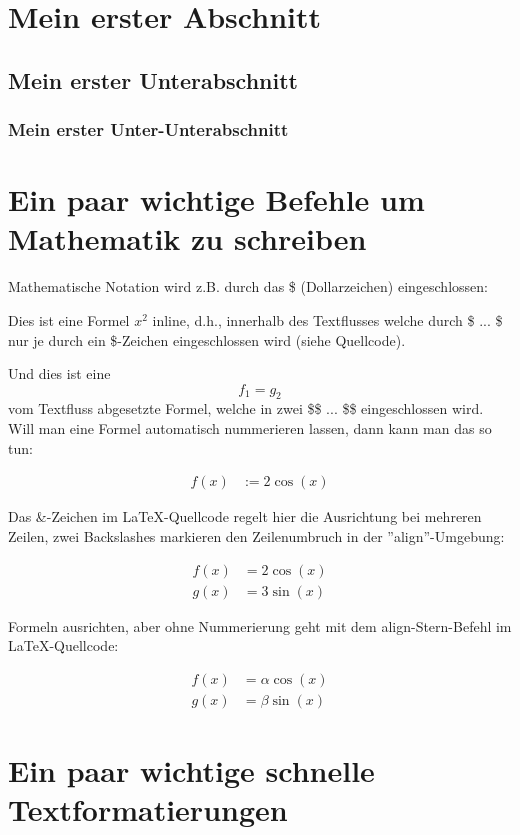 \section{Mein erster Abschnitt}

\subsection{Mein erster Unterabschnitt}

\subsubsection{Mein erster Unter-Unterabschnitt}

\section{Ein paar wichtige Befehle um Mathematik zu schreiben}

Mathematische Notation wird z.B. durch das \$ (Dollarzeichen) eingeschlossen: 

Dies ist eine Formel $x^2$ inline, d.h., innerhalb des Textflusses welche durch \$ ... \$ nur je durch ein \$-Zeichen eingeschlossen wird (siehe Quellcode).

Und dies ist eine $$f_1 = g_2$$ vom Textfluss abgesetzte Formel, welche in zwei \$\$ ... \$\$ eingeschlossen wird. Will man eine Formel automatisch nummerieren lassen, dann kann man das so tun:

\begin{align}
	f(x) &:= 2 \cos(x)
\end{align}

Das \&-Zeichen im LaTeX-Quellcode regelt hier die Ausrichtung bei mehreren Zeilen, zwei Backslashes markieren den Zeilenumbruch in der ''align''-Umgebung:

\begin{align}
	f(x) &= 2 \cos(x) \\
	g(x) &= 3 \sin(x)
\end{align}

Formeln ausrichten, aber ohne Nummerierung geht mit dem align-Stern-Befehl im LaTeX-Quellcode:

\begin{align*}
	f(x) &= \alpha \cos(x) \\
	g(x) &= \beta \sin(x)
\end{align*}		

\section{Ein paar wichtige schnelle Textformatierungen}

